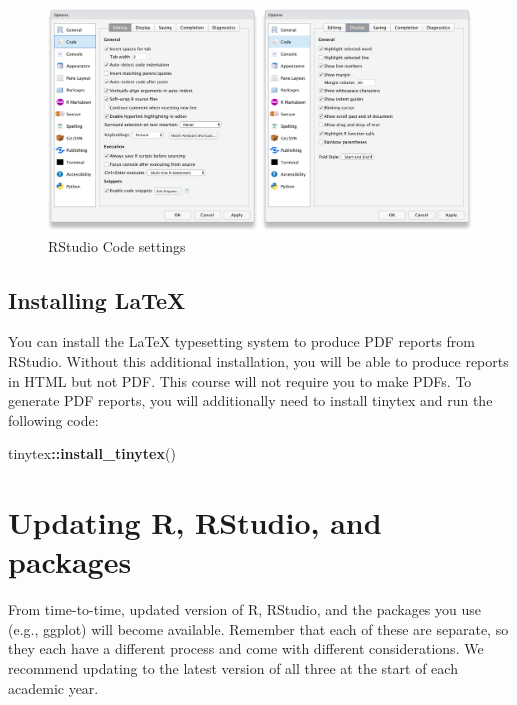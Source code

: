 \documentclass[
  oneside]{book}
\newenvironment{Shaded}{\begin{snugshade}}{\end{snugshade}}
\newcommand{\FunctionTok}[1]{\textcolor[rgb]{0.13,0.29,0.53}{\textbf{#1}}}
\newcommand{\NormalTok}[1]{#1}
\newcommand{\SpecialCharTok}[1]{\textcolor[rgb]{0.81,0.36,0.00}{\textbf{#1}}}
\begin{document}
\begin{figure}

{\centering \includegraphics[width=1\linewidth]{images/rstudio_settings_code} 

}

\caption{RStudio Code settings}\label{fig:settings-code}
\end{figure}

\hypertarget{installing-latex}{%
\section{Installing LaTeX}\label{installing-latex}}

You can install the LaTeX typesetting system to produce PDF reports from RStudio. Without this additional installation, you will be able to produce reports in HTML but not PDF. This course will not require you to make PDFs. To generate PDF reports, you will additionally need to install tinytex \citep{R-tinytex} and run the following code:

\begin{Shaded}
\begin{Highlighting}[]
\NormalTok{tinytex}\SpecialCharTok{::}\FunctionTok{install\_tinytex}\NormalTok{()}
\end{Highlighting}
\end{Shaded}

\hypertarget{appendix-updating-r}{%
\chapter{Updating R, RStudio, and packages}\label{appendix-updating-r}}

From time-to-time, updated version of R, RStudio, and the packages you use (e.g., ggplot) will become available. Remember that each of these are separate, so they each have a different process and come with different considerations. We recommend updating to the latest version of all three at the start of each academic year.
\end{document}

